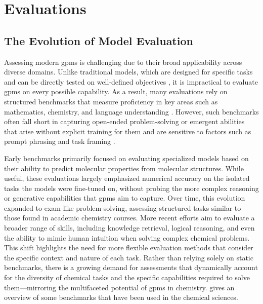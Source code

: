\section{Evaluations} \label{sec:evals}
\subsection{The Evolution of Model Evaluation}

Assessing modern \glspl{gpm} is challenging due to their broad applicability across diverse domains. 
Unlike traditional models, which are designed for specific tasks and can be directly tested on well-defined objectives \autocite{raschka2018model}, it is impractical to evaluate \glspl{gpm} on every possible capability. As a result, many evaluations rely on structured benchmarks that measure proficiency in key areas such as mathematics, chemistry, and language understanding \autocite{tikhonov2023post}. 
However, such benchmarks often fall short in capturing open-ended problem-solving or emergent abilities that arise without explicit training for them and are sensitive to factors such as prompt phrasing and task framing \autocite{Siska2024}.

Early benchmarks primarily focused on evaluating specialized models based on their ability to predict molecular properties from molecular structures. \autocite{wu2018moleculenet} 
While useful, these evaluations largely emphasized numerical accuracy on the isolated tasks the models were fine-tuned on, without probing the more complex reasoning or generative capabilities that \glspl{gpm} aim to capture. 
Over time, this evolution expanded to exam-like problem-solving, assessing structured tasks similar to those found in academic chemistry courses. \autocite{zaki2023mascqa0, li2023camel} 
More recent efforts aim to evaluate a broader range of skills, including knowledge retrieval, logical reasoning, and even the ability to mimic human intuition when solving complex chemical problems.\autocite{feng2024sciknoweval0, mirza2024large} 
This shift highlights the need for more flexible evaluation methods that consider the specific context and nature of each task. Rather than relying solely on static benchmarks, there is a growing demand for assessments that dynamically account for the diversity of chemical tasks and the specific capabilities required to solve them---mirroring the multifaceted potential of \glspl{gpm} in chemistry.  gives an overview of some benchmarks that have been used in the chemical sciences.


